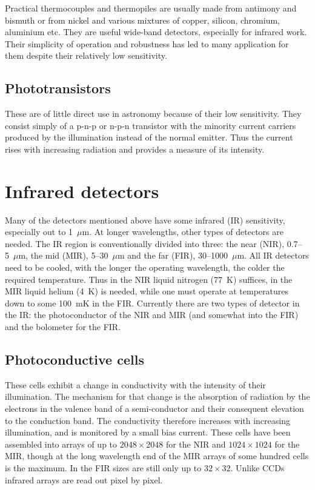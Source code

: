 Practical thermocouples and thermopiles are usually made from antimony
and bismuth or from nickel and various mixtures of copper, silicon,
chromium, aluminium etc. They are useful wide-band detectors,
especially for infrared work. Their simplicity of operation and
robustness has led to many application for them despite their
relatively low sensitivity.

\subsection{Phototransistors}
These are of little direct use in
astronomy because of their low sensitivity. They consist simply of a
p-n-p or n-p-n transistor with the minority current carriers produced
by the illumination instead of the normal emitter. Thus the current
rises with increasing radiation and provides a measure of its intensity.


\section{Infrared detectors}

Many of the detectors mentioned above have some infrared (IR) sensitivity, 
especially out to 1~$\mu$m. At longer wavelengths, other types of detectors
are needed. The IR region is conventionally divided into three: the near
(NIR), 0.7--5~$\mu$m, the mid (MIR), 5--30~$\mu$m and the far (FIR), 
30--1000~$\mu$m. All IR detectors need to be cooled, with the longer the
operating wavelength, the colder the required temperature. Thus in the 
NIR liquid nitrogen (77~K) suffices, in the MIR liquid helium (4~K) is 
needed, while one must operate at temperatures down to some 100~mK in the 
FIR. Currently there are two types of detector in the IR: the photoconductor
of the NIR and MIR (and somewhat into the FIR) and the bolometer for the
FIR.

\subsection{Photoconductive cells}
These cells exhibit a change in conductivity with the 
intensity of their illumination. The mechanism for that change is the 
absorption of radiation by the electrons in the valence band of a 
semi-conductor and their consequent elevation to the conduction band. The
conductivity therefore increases with increasing illumination, and is monitored
by a small bias current. These cells have been assembled into arrays of 
up to $2048\times 2048$ for the NIR and $1024\times 1024$ for the MIR, 
though at the long wavelength end of the MIR arrays of some hundred cells is
the maximum. In the FIR sizes are still only up to $32\times 32$. Unlike
CCDs infrared arrays are read out pixel by pixel. 

